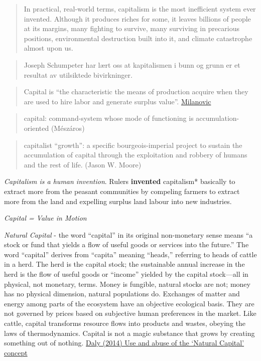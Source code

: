 \documentclass[
]{book}
\begin{document}
\begin{quote}
In practical, real-world terms, capitalism is the most inefficient system ever invented. Although it produces riches for some, it leaves billions of people at its margins, many fighting to survive, many surviving in precarious positions, environmental destruction built into it, and climate catastrophe almost upon us.
\end{quote}

\begin{quote}
Joseph Schumpeter har lært oss at kapitalismen i bunn og grunn er et resultat av utilsiktede bivirkninger.
\end{quote}

\begin{quote}
Capital is ``the characteristic the means of production acquire when they are used to hire labor and generate surplus value''.
\href{https://branko2f7.substack.com/p/capital-as-a-historic-concept}{Milanovic}
\end{quote}

\begin{quote}
capital: command-system whose mode of functioning is accumulation-oriented (Mészáros)
\end{quote}

\begin{quote}
capitalist ``growth'': a specific bourgeois-imperial project to sustain the accumulation of capital through the exploitation and robbery of humans and the rest of life. (Jason W. Moore)
\end{quote}

\emph{Capitalism is a human invention}.
Rulers \textbf{invented} capitalism* basically to
extract more from the peasant communities by compeling farmers to extract more from the land
and expelling surplus land labour into new industries.

\emph{Capital = Value in Motion}

\emph{Natural Capital} - the word ``capital'' in its original non-monetary sense means ``a stock or fund that yields a flow of useful goods or services into the future.'' The word ``capital'' derives from ``capita'' meaning ``heads,'' referring to heads of cattle in a herd. The herd is the capital stock; the sustainable annual increase in the herd is the flow of useful goods or ``income'' yielded by the capital stock---all in physical, not monetary, terms. Money is fungible, natural stocks are not; money has no physical dimension, natural populations do. Exchanges of matter and energy among parts of the ecosystem have an objective ecological basis. They are not governed by prices based on subjective human preferences in the market.
Like cattle, capital transforms resource flows into products and wastes, obeying the laws of thermodynamics. Capital is not a magic substance that grows by creating something out of nothing.
\href{https://steadystate.org/use-and-abuse-of-the-natural-capital-concept/}{Daly (2014) Use and abuse of the `Natural Capital' concept}
\end{document}
